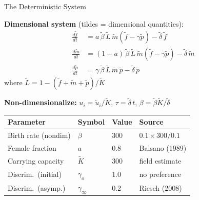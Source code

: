 \documentclass{beamer}
\begin{document}
\begin{frame}{The Deterministic System}
  \footnotesize

  \textbf{Dimensional system} (tildes = dimensional quantities):
  \begin{align*}
    \frac{d\tilde{f}}{dt} &=
      a\,\tilde{\beta}\,\tilde{L}\,\tilde{m}(\tilde{f}-\gamma\tilde{p})
      - \tilde{\delta}\,\tilde{f} \\[4pt]
    \frac{d\tilde{m}}{dt} &=
      (1-a)\,\tilde{\beta}\,\tilde{L}\,\tilde{m}(\tilde{f}-\gamma\tilde{p})
      - \tilde{\delta}\,\tilde{m} \\[4pt]
    \frac{d\tilde{p}}{dt} &=
      \gamma\,\tilde{\beta}\,\tilde{L}\,\tilde{m}\,\tilde{p}
      - \tilde{\delta}\,\tilde{p}
  \end{align*}
  where $\tilde{L} = 1 - (\tilde{f}+\tilde{m}+\tilde{p})/\tilde{K}$

  \vspace{0.3cm}
  \textbf{Non-dimensionalize:} $u_i = \tilde{u}_i/\tilde{K}$,
  $\tau = \tilde{\delta}\,t$, $\beta = \tilde{\beta}\tilde{K}/\tilde{\delta}$

  \vspace{0.2cm}
  \begin{center}
  \begin{tabular}{llll}
    \toprule
    Parameter & Symbol & Value & Source \\
    \midrule
    Birth rate (nondim) & $\beta$ & 300 & $0.1 \times 300 / 0.1$ \\
    Female fraction & $a$ & 0.8 & Balsano (1989) \\
    Carrying capacity & $\tilde{K}$ & 300 & field estimate \\
    Discrim.\ (initial) & $\gamma_o$ & 1.0 & no preference \\
    Discrim.\ (asymp.) & $\gamma_\infty$ & 0.2 & Riesch (2008) \\
    \bottomrule
  \end{tabular}
  \end{center}

\end{frame}
\end{document}
